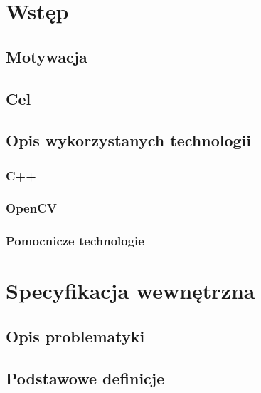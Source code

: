 \chapter{Wstęp}\label{Chapter_Wstep}

\section{Motywacja}\label{Section_Motywacja}

\section{Cel}\label{Section_Cel}

\section{Opis wykorzystanych technologii}\label{Section_Technologie}

\subsection{C++}\label{Subsection_Cpp}
\cite{CppStroustrup}
\cite{EffectiveCpp}
\cite{MoreEffectiveCpp}
\cite{EffectiveStl}

\subsection{OpenCV}\label{Subsection_OpenCV}
\cite{LearningOpenCV}
\cite{OpenCVCookbook}

\subsection{Pomocnicze technologie}\label{Subsection_PomocniczeTechnologie}

\chapter{Specyfikacja wewnętrzna}\label{Chapter_SpecyfikacjaWewnetrzna}

\section{Opis problematyki}\label{Section_Problematyka}
\cite{TrackingClusteringGpu10}

\section{Podstawowe definicje}\label{Section_Definicje}


